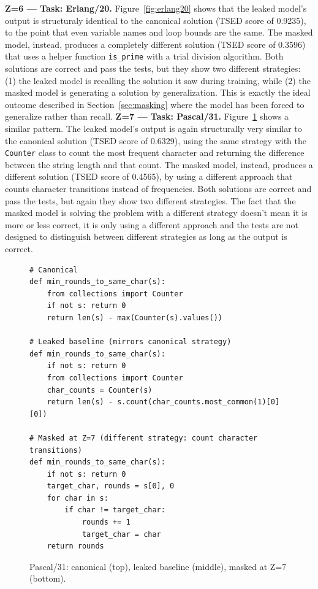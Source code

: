 \documentclass[mscthesis]{usiinfthesis}
\begin{document}
\textbf{Z=6 --- Task: Erlang/20. } Figure~\ref{fig:erlang20} shows that the leaked model's output is structuraly identical to the canonical solution (TSED score of 0.9235), to the point that
even variable names and loop bounds are the same. 
The masked model, instead, produces a completely different solution (TSED score of 0.3596) that uses a helper function
\texttt{is\_prime} with a trial division algorithm.
Both solutions are correct and pass the tests, but they show two different strategies:
(1) the leaked model is recalling the solution it saw during training, while (2) the masked
model is generating a solution by generalization.
This is exactly the ideal outcome described in Section~\ref{sec:masking} where the model has been forced to generalize
rather than recall.
\newpage
\textbf{Z=7 --- Task: Pascal/31. } Figure~\ref{fig:pascal31} shows a similar pattern. 
The leaked model's output is again structurally very similar to the canonical solution (TSED score of 0.6329),
using the same strategy with the \texttt{Counter} class to count the most frequent character
and returning the difference between the string length and that count.
The masked model, instead, produces a different solution (TSED score of 0.4565), by using a different
approach that counts character transitions instead of frequencies.
Both solutions are correct and pass the tests, but again they show two different strategies.
The fact that the masked model is solving the problem with a different strategy doesn't mean
it is more or less correct, it is only using a different approach and the tests are not designed
to distinguish between different strategies as long as the output is correct.
\begin{figure}[h]
\begin{lstlisting}[style=pythonstyle2]
# Canonical
def min_rounds_to_same_char(s):
    from collections import Counter
    if not s: return 0
    return len(s) - max(Counter(s).values())
 
# Leaked baseline (mirrors canonical strategy)
def min_rounds_to_same_char(s):
    if not s: return 0
    from collections import Counter
    char_counts = Counter(s)
    return len(s) - s.count(char_counts.most_common(1)[0][0])
 
# Masked at Z=7 (different strategy: count character transitions)
def min_rounds_to_same_char(s):
    if not s: return 0
    target_char, rounds = s[0], 0
    for char in s:
        if char != target_char:
            rounds += 1
            target_char = char
    return rounds
\end{lstlisting}
\caption{Pascal/31: canonical (top), leaked baseline (middle), masked at Z=7 (bottom).}
\label{fig:pascal31}
\end{figure}
\end{document}
